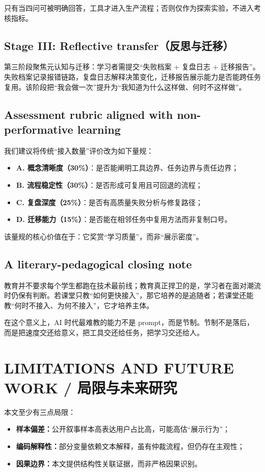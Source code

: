 \documentclass[11pt,a4paper]{ctexart}
\begin{document}
只有当四问可被明确回答，工具才进入生产流程；否则仅作为探索实验，不进入考核指标。

\subsection{Stage III: Reflective transfer（反思与迁移）}
第三阶段聚焦元认知与迁移：学习者需提交“失败档案 + 复盘日志 + 迁移报告”。失败档案记录报错链路，复盘日志解释决策变化，迁移报告展示能力是否能跨任务复用。该阶段把“我会做一次”提升为“我知道为什么这样做、何时不这样做”。

\subsection{Assessment rubric aligned with non-performative learning}
我们建议将传统“接入数量”评价改为如下量规：
\begin{itemize}[leftmargin=1.2em]
\item \textbf{A. 概念清晰度（30\%）}：是否能阐明工具边界、任务边界与责任边界；
\item \textbf{B. 流程稳定性（30\%）}：是否形成可复用且可回退的流程；
\item \textbf{C. 复盘深度（25\%）}：是否有高质量失败分析与修复路径；
\item \textbf{D. 迁移能力（15\%）}：是否能在相邻任务中复用方法而非复制口号。
\end{itemize}

该量规的核心价值在于：它奖赏“学习质量”，而非“展示密度”。

\subsection{A literary-pedagogical closing note}
教育并不要求每个学生都跑在技术最前线；教育真正捍卫的是，学习者在面对潮流时仍保有判断。若课堂只教“如何更快接入”，那它培养的是追随者；若课堂还能教“何时不接入、为何不接入”，它才培养主体。

在这个意义上，AI 时代最难教的能力不是 prompt，而是节制。节制不是落后，而是把速度交还给意义，把工具交还给任务，把学习交还给人。

\section{LIMITATIONS AND FUTURE WORK / 局限与未来研究}
本文至少有三点局限：
\begin{itemize}[leftmargin=1.2em]
\item \textbf{样本偏差：}公开叙事样本高表达用户占比高，可能高估“展示行为”；
\item \textbf{编码解释性：}部分变量依赖文本解释，虽有仲裁流程，但仍存在主观性；
\item \textbf{因果边界：}本文提供结构性关联证据，而非严格因果识别。
\end{itemize}
\end{document}
